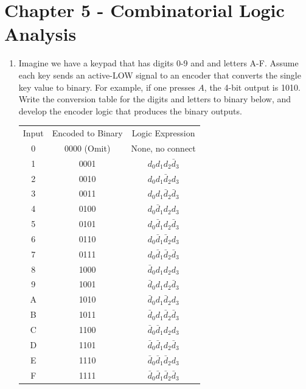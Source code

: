 \documentclass[10pt]{article}
\begin{document}
\maketitle

\section{Chapter 5 - Combinatorial Logic Analysis}
\label{sec:comb}

\begin{enumerate}
\item Imagine we have a keypad that has digits 0-9 and and letters A-F.  Assume each key sends an active-LOW signal to an encoder that converts the single key value to binary.  For example, if one presses $A$, the 4-bit output is 1010.  Write the conversion table for the digits and letters to binary below, and develop the encoder logic that produces the binary outputs. \\
\begin{table}[ht]
\centering
\begin{tabular}{| c | c | c |}
\hline
\hline
Input & Encoded to Binary & Logic Expression \\
0 & 0000 (Omit) & None, no connect \\ 
1 & 0001 & $d_0 d_1 d_2 \bar{d}_3$ \\ 
2 & 0010 & $d_0 d_1 \bar{d}_2 d_3$ \\ 
3 & 0011 & $d_0 d_1 \bar{d}_2 \bar{d}_3$ \\ 
4 & 0100 & $d_0 \bar{d}_1 d_2 d_3$ \\
5 & 0101 & $d_0 \bar{d}_1 d_2 \bar{d}_3$ \\ 
6 & 0110 & $d_0 \bar{d}_1 \bar{d}_2 d_3$ \\ 
7 & 0111 & $d_0 \bar{d}_1 \bar{d}_2 \bar{d}_3$ \\ 
8 & 1000 & $\bar{d}_0 d_1 d_2 d_3$ \\ 
9 & 1001 & $\bar{d}_0 d_1 d_2 \bar{d}_3$ \\ 
A & 1010 & $\bar{d}_0 d_1 \bar{d}_2 d_3$ \\ 
B & 1011 & $\bar{d}_0 d_1 \bar{d}_2 \bar{d}_3$ \\ 
C & 1100 & $\bar{d}_0 \bar{d}_1 d_2 d_3$ \\ 
D & 1101 & $\bar{d}_0 \bar{d}_1 d_2 \bar{d}_3$ \\ 
E & 1110 & $\bar{d}_0 \bar{d}_1 \bar{d}_2 d_3$ \\ 
F & 1111 & $\bar{d}_0 \bar{d}_1 \bar{d}_2 \bar{d}_3$ \\ \hline

\end{tabular}
\end{table}
\end{enumerate}
\end{document}
